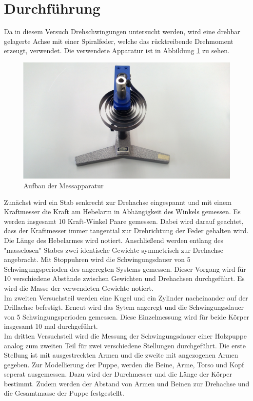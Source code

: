 \section{Durchführung}
\label{sec:Durchführung}

Da in diesem Versuch Drehschwingungen untersucht werden, wird eine drehbar gelagerte
Achse mit einer Spiralfeder, welche das rücktreibende Drehmoment erzeugt, verwendet.
Die verwendete Apparatur ist in Abbildung \ref{fig:Aufbau} zu sehen.

\begin{figure}
  \centering
  \includegraphics[scale=0.05]{content/Apparatur_1.jpg}
  \caption{Aufbau der Messapparatur}
  \label{fig:Aufbau}
\end{figure}

Zunächst wird ein Stab senkrecht zur Drehachse eingespannt und 
mit einem Kraftmesser die Kraft am Hebelarm in Abhängigkeit des 
Winkels gemessen. Es werden insgesamt 10 Kraft-Winkel Paare 
gemessen. Dabei wird darauf geachtet, dass der Kraftmesser immer
tangential zur Drehrichtung der Feder gehalten wird. Die Länge 
des Hebelarmes wird notiert. 
Anschließend werden entlang des "masselosen" Stabes zwei identische
Gewichte symmetrisch zur Drehachse angebracht. Mit Stoppuhren 
wird die Schwingungsdauer von 5 Schwingungsperioden des angeregten
Systems gemessen. Dieser Vorgang wird für 10 verschiedene Abstände 
zwischen Gewichten und Drehachsen durchgeführt. Es wird die Masse 
der verwendeten Gewichte notiert. \\
\newline
Im zweiten Versuchsteil werden eine Kugel und ein Zylinder nacheinander 
auf der Drillachse befestigt. Erneut wird das Sytem angeregt 
und die Schwingungsdauer von 5 Schwingungsperioden gemessen. 
Diese Einzelmessung wird für beide Körper insgesamt 10 mal durchgeführt.\\
\newline
Im dritten Versuchsteil wird die Messung der Schwingungsdauer einer 
Holzpuppe analog zum zweiten Teil für zwei verschiedene Stellungen 
durchgeführt. Die erste Stellung ist mit ausgestreckten Armen und die
zweite mit angezogenen Armen gegeben. Zur Modellierung 
der Puppe, werden die Beine, Arme, Torso und Kopf seperat ausgemessen. 
Dazu wird der Durchmesser und die Länge der Körper bestimmt. Zudem 
werden der Abstand von Armen und Beinen zur Drehachse und die 
Gesamtmasse der Puppe festgestellt. 